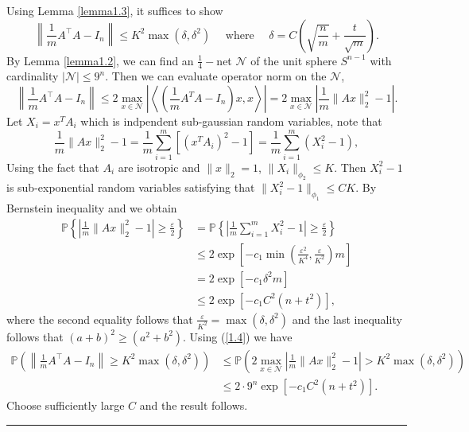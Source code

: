 \documentclass[12pt]{article}
\numberwithin{equation}{section}
\newenvironment{proof}{{\bf Proof:}}{\hfill\rule{2mm}{2mm}}
\begin{document}
\begin{proof}
	Using Lemma \ref{lemma1.3}, it suffices to show
	$$
	\left\|\frac{1}{m} A^{\top} A-I_{n}\right\| \leq K^{2} \max \left(\delta, \delta^{2}\right) \quad \text { where } \quad \delta=C\left(\sqrt{\frac{n}{m}}+\frac{t}{\sqrt{m}}\right).
	$$
	By Lemma \ref{lemma1.2}, we can find an $\frac{1}{4}-$net $\mathcal{N}$ of the unit sphere $S^{n-1}$ with cardinality $|\mathcal{N}|\leq 9^n$. Then we can evaluate operator norm on the $\mathcal{N}$,
\begin{equation}\label{1.4}
	\left\|\frac{1}{m} A^{\top} A-I_{n}\right\|\leq 2\max_{x\in \mathcal{N}}\left|\left\langle\left(\frac{1}{m}A^{T} A-I_{n}\right) x, x\right\rangle\right|=2 \max _{x \in \mathcal{N}}\left|\frac{1}{m}\|A x\|_{2}^{2}-1\right|.
\end{equation}
Let $X_i=x^TA_i$ which is indpendent sub-gaussian random variables, note that
$$
\frac{1}{m}\|A x\|_{2}^{2}-1=\frac{1}{m}\sum_{i=1}^{m}[(x^TA_i)^2-1]=\frac{1}{m}\sum_{i=1}^{m}(X_i^2-1),
$$
Using the fact that $A_i$ are isotropic and $\|x\|_2=1$, $\|X_i\|_{\phi_2}\leq K$. Then $X_i^2-1$ is sub-exponential random variables satisfying that $\|X_i^2-1\|_{\phi_1}\leq CK$. By Bernstein inequality and we obtain
\begin{align*}
\mathbb{P}\left\{\left|\frac{1}{m}\|A x\|_{2}^{2}-1\right| \geq \frac{\varepsilon}{2}\right\} &=\mathbb{P}\left\{\left|\frac{1}{m} \sum_{i=1}^{m} X_{i}^{2}-1\right| \geq \frac{\varepsilon}{2}\right\} \\
& \leq 2 \exp \left[-c_{1} \min \left(\frac{\varepsilon^{2}}{K^{4}}, \frac{\varepsilon}{K^{2}}\right) m\right] \\
&=2 \exp \left[-c_{1} \delta^{2} m\right] \\
& \leq 2 \exp \left[-c_{1} C^{2}\left(n+t^{2}\right)\right],
\end{align*}
where the second equality follows that $\frac{\varepsilon}{K^{2}}=\max \left(\delta, \delta^{2}\right)$ and the last inequality follows that $(a+b)^2\geq (a^2+b^2)$.
Using (\ref{1.4}) we have
\begin{align*}
\mathbb{P}\left(\left\|\frac{1}{m} A^{\top} A-I_{n}\right\|\geq  K^{2} \max \left(\delta, \delta^{2}\right)\right)&\leq \mathbb{P}\left(2 \max _{x \in \mathcal{N}}\left|\frac{1}{m}\|A x\|_{2}^{2}-1\right|>K^{2} \max \left(\delta, \delta^{2}\right)\right)\\
&\leq 2\cdot 9^n \exp \left[-c_{1} C^{2}\left(n+t^{2}\right)\right].
\end{align*}
Choose sufficiently large $C$ and the result follows.
\end{proof}
\end{document}
